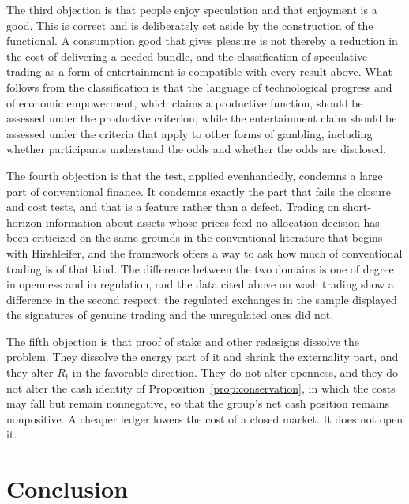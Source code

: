\documentclass[11pt]{article}
\theoremstyle{remark}
\begin{document}
The third objection is that people enjoy speculation and that enjoyment is a good. This is correct and is deliberately set aside by the construction of the functional. A consumption good that gives pleasure is not thereby a reduction in the cost of delivering a needed bundle, and the classification of speculative trading as a form of entertainment is compatible with every result above. What follows from the classification is that the language of technological progress and of economic empowerment, which claims a productive function, should be assessed under the productive criterion, while the entertainment claim should be assessed under the criteria that apply to other forms of gambling, including whether participants understand the odds and whether the odds are disclosed.

The fourth objection is that the test, applied evenhandedly, condemns a large part of conventional finance. It condemns exactly the part that fails the closure and cost tests, and that is a feature rather than a defect. Trading on short-horizon information about assets whose prices feed no allocation decision has been criticized on the same grounds in the conventional literature that begins with Hirshleifer, and the framework offers a way to ask how much of conventional trading is of that kind. The difference between the two domains is one of degree in openness and in regulation, and the data cited above on wash trading show a difference in the second respect: the regulated exchanges in the sample displayed the signatures of genuine trading and the unregulated ones did not.

The fifth objection is that proof of stake and other redesigns dissolve the problem. They dissolve the energy part of it and shrink the externality part, and they alter $R_t$ in the favorable direction. They do not alter openness, and they do not alter the cash identity of Proposition~\ref{prop:conservation}, in which the costs may fall but remain nonnegative, so that the group's net cash position remains nonpositive. A cheaper ledger lowers the cost of a closed market. It does not open it.

\section{Conclusion}\label{sec:conclusion}
\end{document}
